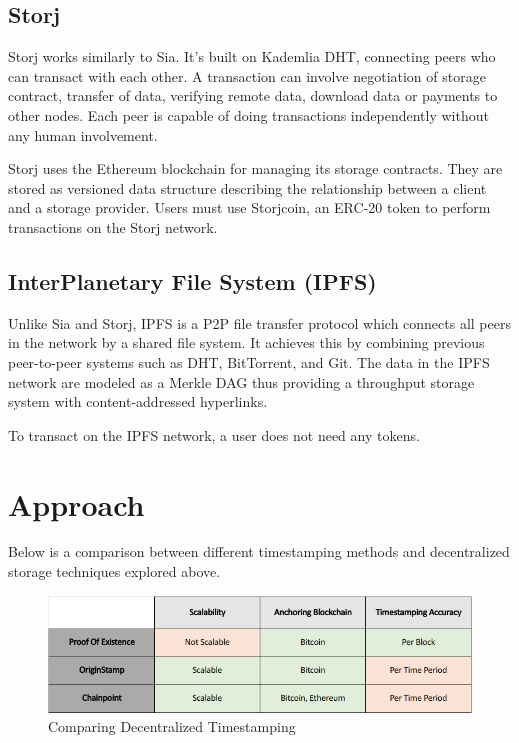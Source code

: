 \documentclass[]{report}
\begin{document}
		\subsection*{Storj}
			Storj works similarly to Sia. It's built on Kademlia DHT, connecting peers who can transact with each other. A transaction can involve negotiation of storage contract, transfer of data, verifying remote data, download data or payments to other nodes. Each peer is capable of doing transactions independently without any human involvement.
			
			Storj uses the Ethereum blockchain for managing its storage contracts. They are stored as versioned data structure describing the relationship between a client and a storage provider. Users must use Storjcoin, an ERC-20 token to perform transactions on the Storj network. 
		
		\subsection*{InterPlanetary File System (IPFS)}
			Unlike Sia and Storj, IPFS is a P2P file transfer protocol which connects all peers in the network by a shared file system. It achieves this by combining previous peer-to-peer systems such as DHT, BitTorrent, and Git. The data in the IPFS network are modeled as a Merkle DAG thus providing a throughput storage system with content-addressed hyperlinks.
			
			To transact on the IPFS network, a user does not need any tokens.
	
	\section*{Approach}
		Below is a comparison between different timestamping methods and decentralized storage techniques explored above.
		
		\begin{figure}[h]
			\includegraphics[width=\linewidth]{comparison-timestamping.png}
			\caption{Comparing Decentralized Timestamping}
			\label{fig:comparison-timestamping}
		\end{figure}
	
\end{document}
